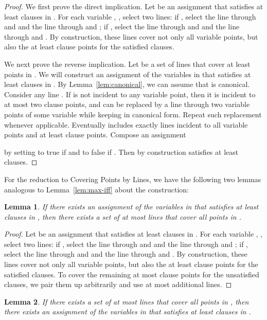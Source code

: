 \documentclass[letterpaper,11pt]{article}
\newtheorem{lemma}{Lemma}
\begin{document}
\begin{proof}
We first prove the direct implication.
Let 
be an assignment that satisfies at least  clauses in .
For each variable , ,
select two lines:
if ,
select the line through  and 
and the line through  and ;
if ,
select the line through  and 
and the line through  and .
By construction,
these  lines cover not only all  variable points,
but also the at least  clause points for the satisfied clauses.

We next prove the reverse implication.
Let  be a set of  lines that cover at least  points in .
We will construct an assignment of the variables in 
that satisfies at least  clauses in .
By Lemma~\ref{lem:canonical}, we can assume that  is canonical.
Consider any line .
If  is not incident to any variable point,
then it is incident to at most two clause points,
and can be replaced by a line through two variable points of some variable
while keeping  in canonical form.
Repeat such replacement whenever applicable.
Eventually  includes exactly  lines
incident to all  variable points
and at least  clause points.
Compose an assignment

by setting  to true if 
and to false if .
Then by construction  satisfies at least  clauses.
\end{proof}

For the reduction to {\sc Covering Points by Lines},
we have the following two lemmas analogous to Lemma~\ref{lem:max-iff}
about the construction:

\begin{lemma}\label{lem:min-direct}
If there exists an assignment of the variables in 
that satisfies at least  clauses in ,
then there exists a set of at most  lines
that cover all points in .
\end{lemma}

\begin{proof}
Let 
be an assignment that satisfies at least  clauses in .
For each variable , ,
select two lines:
if ,
select the line through  and 
and the line through  and ;
if ,
select the line through  and 
and the line through  and .
By construction,
these  lines cover not only all  variable points,
but also the at least  clause points for the satisfied clauses.
To cover the remaining at most  clause points
for the unsatisfied clauses,
we pair them up arbitrarily and use at most 
additional lines.
\end{proof}

\begin{lemma}\label{lem:min-reverse}
If there exists a set of at most  lines
that cover all points in ,
then there exists an assignment of the variables in 
that satisfies at least  clauses in .
\end{lemma}
\end{document}
